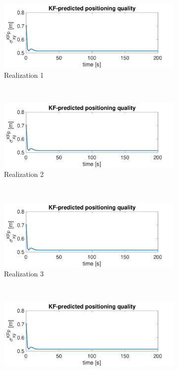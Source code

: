 \documentclass{article}
\begin{document}
\begin{figure}[H]
    \centering
    \begin{subfigure}[t]{0.49\textwidth}
        \centering
        \includegraphics[width=\textwidth]{1_sigma_KF}
        \caption{Realization 1}
    \end{subfigure}
    ~
    \begin{subfigure}[t]{0.49\textwidth}
        \centering
        \includegraphics[width=\textwidth]{2_sigma_KF}
        \caption{Realization 2}
    \end{subfigure}
    ~
    \begin{subfigure}[t]{0.49\textwidth}
        \centering
        \includegraphics[width=\textwidth]{3_sigma_KF}
        \caption{Realization 3}
    \end{subfigure}
    ~
    \begin{subfigure}[t]{0.49\textwidth}
        \centering
        \includegraphics[width=\textwidth]{4_sigma_KF}

\end{subfigure}
\end{figure}
\end{document}
